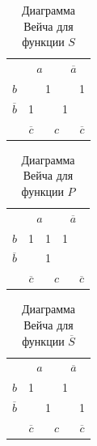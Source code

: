 \documentclass[a4paper,14pt]{article}
\begin{document}
\begin{table}[H]
	\begin{center}
		\caption{\label{tab:tab2} Диаграмма Вейча для функции $S$}
		\begin{tabular}{ccccc}
			& \multicolumn{2}{c}{$a$}                           & \multicolumn{2}{c}{$\overline{a}$}                          \\ \cline{2-5} 
			\multicolumn{1}{c|}{$b$}  & \multicolumn{1}{c|}{}  & \multicolumn{1}{c|}{1} & \multicolumn{1}{c|}{}  & \multicolumn{1}{c|}{1} \\ \cline{2-5} 
			\multicolumn{1}{c|}{$\overline{b}$} & \multicolumn{1}{c|}{1} & \multicolumn{1}{c|}{}  & \multicolumn{1}{c|}{1} & \multicolumn{1}{c|}{}  \\ \cline{2-5} 
			& $\overline{c}$                     & \multicolumn{2}{c}{$c$}                          & $\overline{c}$                     
		\end{tabular}
	\end{center}
\end{table}

\begin{table}[H]
	\begin{center}
		\caption{\label{tab:tab3} Диаграмма Вейча для функции $P$}
		\begin{tabular}{ccccc}
			& \multicolumn{2}{c}{$a$}                           & \multicolumn{2}{c}{$\overline{a}$}                          \\ \cline{2-5} 
			\multicolumn{1}{c|}{$b$}  & \multicolumn{1}{c|}{1}  & \multicolumn{1}{c|}{1} & \multicolumn{1}{c|}{1}  & \multicolumn{1}{c|}{} \\ \cline{2-5} 
			\multicolumn{1}{c|}{$\overline{b}$} & \multicolumn{1}{c|}{} & \multicolumn{1}{c|}{1}  & \multicolumn{1}{c|}{} & \multicolumn{1}{c|}{}  \\ \cline{2-5} 
			& $\overline{c}$                     & \multicolumn{2}{c}{$c$}                          & $\overline{c}$                     
		\end{tabular}
	\end{center}
\end{table}

\begin{table}[H]
	\begin{center}
		\caption{\label{tab:tab4} Диаграмма Вейча для функции $\overline{S}$}
		\begin{tabular}{ccccc}
			& \multicolumn{2}{c}{$a$}                           & \multicolumn{2}{c}{$\overline{a}$}                          \\ \cline{2-5} 
			\multicolumn{1}{c|}{$b$}  & \multicolumn{1}{c|}{1}  & \multicolumn{1}{c|}{} & \multicolumn{1}{c|}{1}  & \multicolumn{1}{c|}{} \\ \cline{2-5} 
			\multicolumn{1}{c|}{$\overline{b}$} & \multicolumn{1}{c|}{} & \multicolumn{1}{c|}{1}  & \multicolumn{1}{c|}{} & \multicolumn{1}{c|}{1}  \\ \cline{2-5} 
			& $\overline{c}$                     & \multicolumn{2}{c}{$c$}                          & $\overline{c}$                     
		\end{tabular}
	\end{center}
\end{table}
\end{document}
